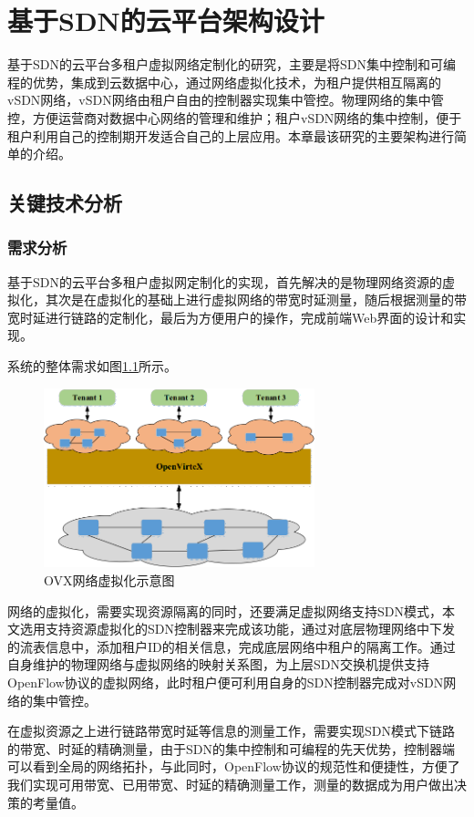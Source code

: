 \chapter{基于SDN的云平台架构设计}
基于SDN的云平台多租户虚拟网络定制化的研究，主要是将SDN集中控制和可编程的优势，集成到云数据中心，通过网络虚拟化技术，为租户提供相互隔离的vSDN网络，vSDN网络由租户自由的控制器实现集中管控。物理网络的集中管控，方便运营商对数据中心网络的管理和维护；租户vSDN网络的集中控制，便于租户利用自己的控制期开发适合自己的上层应用。本章最该研究的主要架构进行简单的介绍。
\section{关键技术分析}
\subsection{需求分析}
基于SDN的云平台多租户虚拟网定制化的实现，首先解决的是物理网络资源的虚拟化，其次是在虚拟化的基础上进行虚拟网络的带宽时延测量，随后根据测量的带宽时延进行链路的定制化，最后为方便用户的操作，完成前端Web界面的设计和实现。

系统的整体需求如图\ref{fig:ovx}所示。

\begin{figure}[!htb]
  \centering
  \includegraphics[width=0.7\textwidth]{logo/ovx.png}
  \caption{OVX网络虚拟化示意图}
  \label{fig:ovx}
\end{figure}

网络的虚拟化，需要实现资源隔离的同时，还要满足虚拟网络支持SDN模式，本文选用支持资源虚拟化的SDN控制器来完成该功能，通过对底层物理网络中下发的流表信息中，添加租户ID的相关信息，完成底层网络中租户的隔离工作。通过自身维护的物理网络与虚拟网络的映射关系图，为上层SDN交换机提供支持OpenFlow协议的虚拟网络，此时租户便可利用自身的SDN控制器完成对vSDN网络的集中管控。

在虚拟资源之上进行链路带宽时延等信息的测量工作，需要实现SDN模式下链路的带宽、时延的精确测量，由于SDN的集中控制和可编程的先天优势，控制器端可以看到全局的网络拓扑，与此同时，OpenFlow协议的规范性和便捷性，方便了我们实现可用带宽、已用带宽、时延的精确测量工作，测量的数据成为用户做出决策的考量值。

